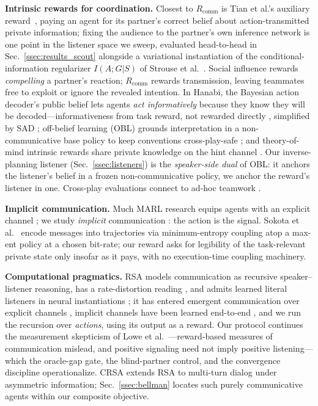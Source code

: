 \documentclass[sigconf,review,anonymous]{acmart}
\newcommand{\Rcomm}{R_{\text{comm}}}
\begin{document}
\textbf{Intrinsic rewards for coordination.} Closest to $\Rcomm$ is Tian et al.'s auxiliary reward~\cite{tian2020implicit}, paying an agent for its partner's correct belief about action-transmitted private information; fixing the audience to the partner's own inference network is one point in the listener space we sweep, evaluated head-to-head in Sec.~\ref{ssec:results_scout} alongside a variational instantiation of the conditional-information regularizer $I(A;G|S)$ of Strouse et al.~\cite{strouse2018learning}. Social influence \cite{jaques2019social} rewards \emph{compelling} a partner's reaction; $\Rcomm$ rewards transmission, leaving teammates free to exploit or ignore the revealed intention. In Hanabi, the Bayesian action decoder's public belief lets agents \emph{act informatively} because they know they will be decoded---informativeness from task reward, not rewarded directly \cite{bard}, simplified by SAD \cite{sad}; off-belief learning (OBL) grounds interpretation in a non-communicative base policy to keep conventions cross-play-safe \cite{obl}; and theory-of-mind intrinsic rewards share private knowledge on the hint channel \cite{fuchs2021theory,oguntola2023theory}. Our inverse-planning listener (Sec.~\ref{ssec:listeners}) is the \emph{speaker-side dual} of OBL: it anchors the listener's belief in a frozen non-communicative policy, we anchor the reward's listener in one. Cross-play evaluations connect to ad-hoc teamwork \cite{mirsky2022survey}.

\textbf{Implicit communication.} Much MARL research equips agents with an explicit channel \cite{foerster2016learning,sukhbaatar2016learning,kim2021communication,boldt2024review}; we study \emph{implicit} communication \cite{knepper2017implicit}: the action is the signal. Sokota et al.~\cite{sokota2022communicating} encode messages into trajectories via minimum-entropy coupling atop a max-ent policy at a chosen bit-rate; our reward asks for legibility of the task-relevant private state only insofar as it pays, with no execution-time coupling machinery.

\textbf{Computational pragmatics.} RSA \cite{goodman2016pragmatic} models communication as recursive speaker--listener reasoning, has a rate-distortion reading \cite{zaslavsky2021rate}, and admits learned literal listeners in neural instantiations \cite{monroe2015learning,andreas2016reasoning,fried2018unified}; it has entered emergent communication over explicit channels \cite{kang2020pragmatic}, implicit channels have been learned end-to-end \cite{wang2025implicit}, and we run the recursion over \emph{actions}, using its output as a reward. Our protocol continues the measurement skepticism of Lowe et al.~\cite{lowe2019pitfalls}---reward-based measures of communication mislead, and positive signaling need not imply positive listening---which the oracle-gap gate, the blind-partner control, and the convergence discipline operationalize. CRSA \cite{estienne2025collaborative} extends RSA to multi-turn dialog under asymmetric information; Sec.~\ref{ssec:bellman} locates such purely communicative agents within our composite objective.
\end{document}
